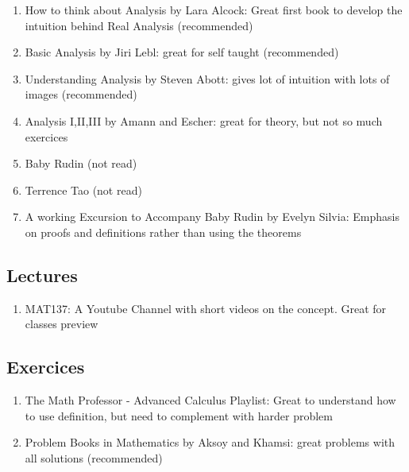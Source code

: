 \documentclass{article}
\begin{document}
\begin{enumerate}
    \item How to think about Analysis by Lara Alcock: Great first book
	to develop the intuition behind Real Analysis (recommended)
    \item Basic Analysis by Jiri Lebl: great for self taught (recommended)
    \item Understanding Analysis by Steven Abott: gives lot of intuition
	with lots of images (recommended)
    \item Analysis I,II,III by Amann and Escher: great for theory, but
	not so much exercices
    \item Baby Rudin (not read)
    \item Terrence Tao (not read)
    \item A working Excursion to Accompany Baby Rudin by Evelyn Silvia:
	Emphasis on proofs and definitions rather than using the theorems
\end{enumerate}

\subsection{Lectures}%
\label{sub:Lectures}

\begin{enumerate}
    \item MAT137: A Youtube Channel with short videos on the concept.
	Great for classes preview
\end{enumerate}

\subsection{Exercices}%
\label{sub:Exercices}

\begin{enumerate}
    \item The Math Professor - Advanced Calculus Playlist: Great to
	understand how to use definition, but need to complement with
	harder problem
    \item Problem Books in Mathematics by Aksoy and Khamsi: great problems
	with all solutions (recommended)
\end{enumerate}
\end{document}
